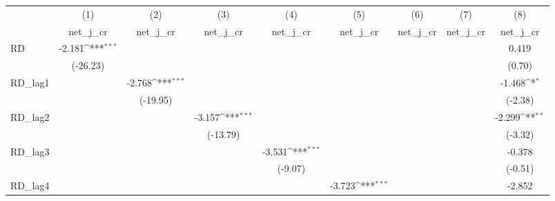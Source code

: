 {
\def\sym#1{\ifmmode^{#1}\else\(^{#1}\)\fi}
\begin{tabular}{l*{8}{c}}
\toprule
            &\multicolumn{1}{c}{(1)}&\multicolumn{1}{c}{(2)}&\multicolumn{1}{c}{(3)}&\multicolumn{1}{c}{(4)}&\multicolumn{1}{c}{(5)}&\multicolumn{1}{c}{(6)}&\multicolumn{1}{c}{(7)}&\multicolumn{1}{c}{(8)}\\
            &\multicolumn{1}{c}{net\_j\_cr}&\multicolumn{1}{c}{net\_j\_cr}&\multicolumn{1}{c}{net\_j\_cr}&\multicolumn{1}{c}{net\_j\_cr}&\multicolumn{1}{c}{net\_j\_cr}&\multicolumn{1}{c}{net\_j\_cr}&\multicolumn{1}{c}{net\_j\_cr}&\multicolumn{1}{c}{net\_j\_cr}\\
\midrule
RD          &      -2.181\sym{***}&                     &                     &                     &                     &                     &                     &       0.419         \\
            &    (-26.23)         &                     &                     &                     &                     &                     &                     &      (0.70)         \\
\addlinespace
RD\_lag1     &                     &      -2.768\sym{***}&                     &                     &                     &                     &                     &      -1.468\sym{*}  \\
            &                     &    (-19.95)         &                     &                     &                     &                     &                     &     (-2.38)         \\
\addlinespace
RD\_lag2     &                     &                     &      -3.157\sym{***}&                     &                     &                     &                     &      -2.299\sym{**} \\
            &                     &                     &    (-13.79)         &                     &                     &                     &                     &     (-3.32)         \\
\addlinespace
RD\_lag3     &                     &                     &                     &      -3.531\sym{***}&                     &                     &                     &      -0.378         \\
            &                     &                     &                     &     (-9.07)         &                     &                     &                     &     (-0.51)         \\
\addlinespace
RD\_lag4     &                     &                     &                     &                     &      -3.723\sym{***}&                     &                     &      -2.852         \\

\end{tabular}}
